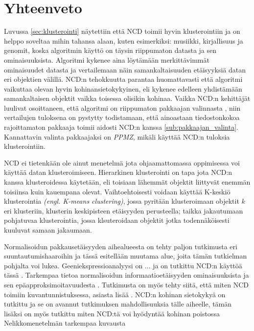 \documentclass[12pt,finnish]{tktltiki2}
\theoremstyle{definition}
\theoremstyle{remark}
\newcommand{\engl}[1]{\emph{(engl. #1)}}
\begin{document}



\section{Yhteenveto} %
\label{sec:yhteenveto}

  Luvussa \ref{sec:klusterointi} näytettiin että NCD toimii hyvin klusterointiin ja on helppo soveltaa mihin tahansa alaan, kuten esimerkiksi: musiikki, kirjallisuus ja genomit, koska algoritmin käyttö on täysin riippumaton datasta ja sen ominaisuuksista. Algoritmi kykenee aina löytämään merkittävimmät ominaisuudet datasta ja vertailemaan näin samankaltaisuuden etäisyyksiä datan eri objektien välillä.
  NCD:n tehokkuutta parantaa huomattavasti että algoritmi vaikuttaa olevan hyvin kohinansietokykyinen, eli kykenee edelleen yhdistämään samankaltaisen objektit vaikka toisessa olisikin kohinaa.
  Vaikka NCD:n kehittäjät luulivat osoittaneen, että algoritmi on riippumaton pakkaajan valinnasta \cite{CV05}, niin vertailujen tuloksena on pystytty todistamaan, että ainoastaan tiedostonkokoa rajoittamaton pakkaaja toimii aidosti NCD:n kanssa \ref{sub:pakkaajan_valinta}.
  Kannattavin valinta pakkaajaksi on \emph{PPMZ}, mikäli käyttää NCD:n tuloksia klusterointiin.

  NCD ei tietenkään ole ainut menetelmä jota ohjaamattomassa oppimisessa voi käyttää datan klusteroimiseen.
  Hierarkinen klusterointi on tapa jota NCD:n kanssa klusteroidessa käytetään, eli toisiaan lähemmät objektit liittyvät enemmän toisiinsa kuin kauempana olevat. Vaihtoehtoisesti voidaan käyttää K-keskiö klusterointia \engl{K-means clustering}, jossa pyritään klusteroimaan objektit $k$ eri klusteriin, klusterin keskipisteen etäisyyden perusteella; taikka jakautumaan pohjatuvaa klusterointia, jossa klsuteroidaan objektit jotka todennäköisesti kuuluvat samaan jakaumaan.

  Normalisoidun pakkausetäisyyden aihealueesta on tehty paljon tutkimusta eri suuntautumishaaroihin ja tässä esitellään muutama alue, joita tämän tutkielman pohjalta voi lukea.
  Geeniekspressioanalyysi on ... ja on tutkittu NCD:n käyttöä tässä \cite{nykter2005normalized}.
  Tarkempaa tietoa normalisoidun informaatioetäisyyden ominaisuuksista ja sen epäapproksimoitavuudesta \cite{terwijn2011nonapproximability}.
  Tutkimusta on myös tehty siitä, että miten NCD toimiin kuvantunnistuksessa, asiasta lisää \cite{doi:10.1117/12.704334}.
  NCD:n kohinan sietokykyä on tutkittu ja se on avannut tutkimuksen mahdollisuuksia tälle aiheelle, tämän lisäksi on myös tutkittu miten NCD:tä voi hyödyntää kohinan poistossa \cite{vitanyi2013similarity}
  Nelikkomenetelmän tarkempaa kuvausta \cite{DBLP:journals/corr/abs-cs-0606048}
\end{document}
